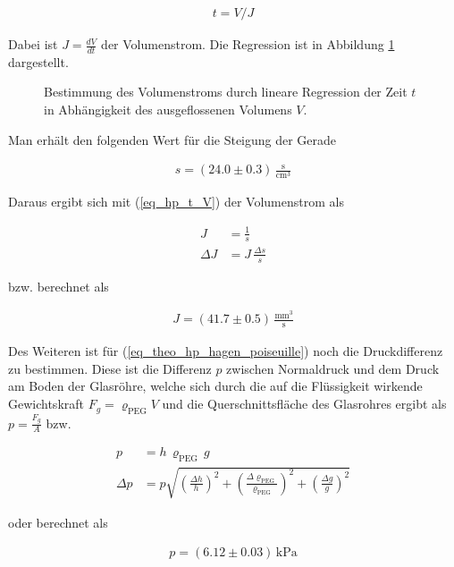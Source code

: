 \documentclass[12pt,a4paper,german]{scrartcl}
\numberwithin{equation}{section}
\begin{document}
  \begin{align}
    t = V / J
    \label{eq_hp_t_V}
  \end{align}

  Dabei ist $J = \frac{d V}{d t}$ der Volumenstrom. Die Regression ist in Abbildung \ref{fig_hp_volume_flow} dargestellt.

  \begin{figure}[h]
    \centering
    \resizebox{\textwidth}{!}{
      
    }
    \caption{Bestimmung des Volumenstroms durch lineare Regression der Zeit $t$ in Abhängigkeit des ausgeflossenen Volumens $V$.}
    \label{fig_hp_volume_flow}
  \end{figure}

  Man erhält den folgenden Wert für die Steigung der Gerade

  \begin{align}
    s = (24.0 \pm 0.3) \, \frac{\text{s}}{\text{cm}^3}
  \end{align}

  Daraus ergibt sich mit (\ref{eq_hp_t_V}) der Volumenstrom als

  \begin{align}
    J &= \frac{1}{s} \nonumber \\
    \Delta J &= J \, \frac{\Delta s}{s}
  \end{align}

  bzw. berechnet als

  \begin{align}
    J = (41.7 \pm 0.5) \, \frac{\text{mm}^3}{\text{s}}
  \end{align}

  Des Weiteren ist für (\ref{eq_theo_hp_hagen_poiseuille}) noch die Druckdifferenz zu bestimmen.
  Diese ist die Differenz $p$ zwischen Normaldruck und dem Druck am Boden der Glasröhre, welche sich durch die auf die Flüssigkeit wirkende Gewichtskraft $F_g = \varrho_\text{PEG} V$ und die Querschnittsfläche des Glasrohres ergibt als $p = \frac{F_g}{A}$ bzw.

  \begin{align}
    p &= h \, \varrho_\text{PEG} \, g \nonumber \\
    \Delta p &= p \sqrt{\left(\frac{\Delta h}{h} \right)^2 + \left(\frac{\Delta \varrho_\text{PEG}}{\varrho_\text{PEG}} \right)^2 + \left(\frac{\Delta g}{g} \right)^2}
  \end{align}

  oder berechnet als
  
  \begin{align}
    p = (6.12 \pm 0.03) \, \text{kPa}
  \end{align}
\end{document}
